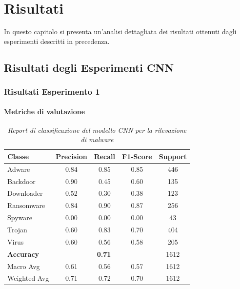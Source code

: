 \chapter{Risultati}
\label{cap:risultati}
In questo capitolo si presenta un'analisi dettagliata dei risultati ottenuti dagli esperimenti descritti in precedenza.
\section{Risultati degli Esperimenti CNN}
\subsection{Risultati Esperimento 1}
\subsubsection{Metriche di valutazione}
\begin{table}[ht]
    \centering
    \begin{tabular}{@{}|lcccc|@{}}
    \toprule
    \textbf{Classe}      & \textbf{Precision} & \textbf{Recall} & \textbf{F1-Score} & \textbf{Support} \\ \midrule
    Adware          & 0.84               & 0.85            & 0.85              & 446              \\
    Backdoor        & 0.90               & 0.45            & 0.60              & 135              \\
    Downloader      & 0.52               & 0.30            & 0.38              & 123              \\
    Ransomware      & 0.84               & 0.90            & 0.87              & 256              \\
    Spyware         & 0.00               & 0.00            & 0.00              & 43               \\
    Trojan          & 0.60               & 0.83            & 0.70              & 404              \\
    Virus           & 0.60               & 0.56            & 0.58              & 205              \\ \midrule
    \textbf{Accuracy}      & \multicolumn{3}{c}{\textbf{0.71}}         & 1612             \\ \midrule
    Macro Avg       & 0.61               & 0.56            & 0.57              & 1612             \\
    Weighted Avg    & 0.71               & 0.72            & 0.70              & 1612             \\ \bottomrule
    \end{tabular}
    \vspace{.2cm}
    \caption{\emph{Report di classificazione del modello CNN per la rilevazione di malware}}
    \label{tab:report_1_esperimento}
\end{table}
